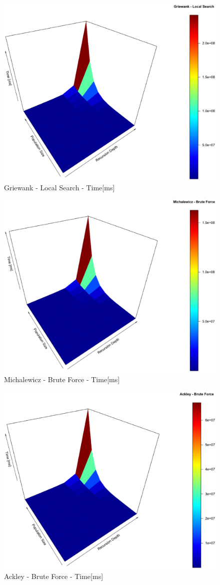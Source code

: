 \documentclass[conference]{IEEEtran}
\begin{document}
\begin{figure}[tbp]
\centering
\includegraphics[width=1.0\hsize,height=0.65\hsize]{fig14.eps}
\caption{Griewank - Local Search - Time[ms]}
\label{fig15}
\end{figure}

\begin{figure}[tbp]
\centering
\includegraphics[width=1.0\hsize,height=0.65\hsize]{fig17.eps}
\caption{Michalewicz - Brute Force - Time[ms]}
\label{fig16}
\end{figure}

\begin{figure}[tbp]
\centering
\includegraphics[width=1.0\hsize,height=0.65\hsize]{fig20.eps}
\caption{Ackley - Brute Force - Time[ms]}
\label{fig17}
\end{figure}
\end{document}
